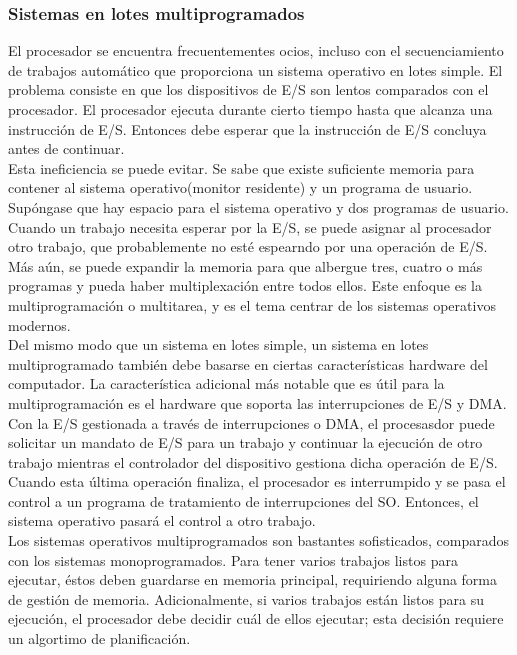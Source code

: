 \documentclass{article}
\begin{document}
				
				\subsubsection{Sistemas en lotes multiprogramados}
					El procesador se encuentra frecuentementes ocios, incluso con el secuenciamiento de trabajos automático que proporciona un sistema operativo en lotes simple. El problema consiste en que los dispositivos de E/S son lentos comparados con el procesador. El procesador ejecuta durante cierto tiempo hasta que alcanza una instrucción de E/S. Entonces debe esperar que la instrucción de E/S concluya antes de continuar. \\
					
					Esta ineficiencia se puede evitar. Se sabe que existe suficiente memoria para contener al sistema operativo(monitor residente) y un programa de usuario. Supóngase que hay espacio para el sistema operativo y dos programas de usuario. Cuando un trabajo necesita esperar por la E/S, se puede asignar al procesador otro trabajo, que probablemente no esté espearndo por una operación de E/S. Más aún, se puede expandir la memoria para que albergue tres, cuatro o más programas y pueda haber multiplexación entre todos ellos. Este enfoque es la multiprogramación o multitarea, y es el tema centrar de los sistemas operativos modernos. \\
					
					Del mismo modo que un sistema en lotes simple, un sistema en lotes multiprogramado también debe basarse en ciertas características hardware del computador. La característica adicional más notable que es útil para la multiprogramación es el hardware que soporta las interrupciones de E/S y DMA. Con la E/S gestionada a través de interrupciones o DMA, el procesasdor puede solicitar un mandato de E/S para un trabajo y continuar la ejecución de otro trabajo mientras el controlador del dispositivo gestiona dicha operación de E/S. Cuando esta última operación finaliza, el procesador es interrumpido y se pasa el control a un programa de tratamiento de interrupciones del SO. Entonces, el sistema operativo pasará el control a otro trabajo. \\
					
					Los sistemas operativos multiprogramados son bastantes sofisticados, comparados con los sistemas monoprogramados. Para tener varios trabajos listos para ejecutar, éstos deben guardarse en memoria principal, requiriendo alguna forma de gestión de memoria. Adicionalmente, si varios trabajos están listos para su ejecución, el procesador debe decidir cuál de ellos ejecutar; esta decisión requiere un algortimo de planificación. 	
					
\end{document}
